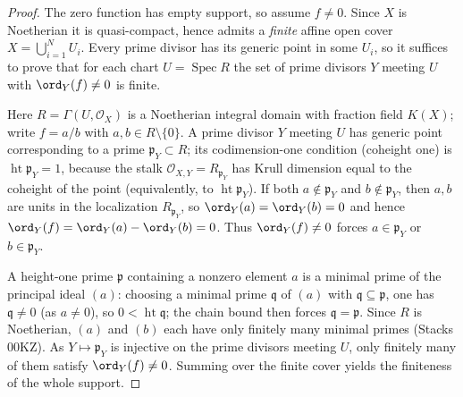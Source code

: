 \begin{proof}
  \leanok
  The zero function has empty support, so assume \(f \ne 0\). Since \(X\) is
  Noetherian it is quasi-compact, hence admits a \emph{finite} affine open cover
  \(X = \bigcup_{i=1}^{N} U_i\). Every prime divisor has its generic point in some
  \(U_i\), so it suffices to prove that for each chart \(U = \operatorname{Spec} R\)
  the set of prime divisors \(Y\) meeting \(U\) with \(\ord_Y(f) \ne 0\) is finite.

  Here \(R = \Gamma(U, \mathcal O_X)\) is a Noetherian integral domain with fraction
  field \(K(X)\); write \(f = a/b\) with \(a, b \in R \setminus \{0\}\). A prime
  divisor \(Y\) meeting \(U\) has generic point corresponding to a prime
  \(\mathfrak p_Y \subset R\); its codimension-one condition (coheight one) is
  \(\operatorname{ht}\mathfrak p_Y = 1\), because the stalk
  \(\mathcal O_{X, Y} = R_{\mathfrak p_Y}\) has Krull dimension equal to the
  coheight of the point (equivalently, to \(\operatorname{ht}\mathfrak p_Y\)). If
  both \(a \notin \mathfrak p_Y\) and \(b \notin \mathfrak p_Y\), then \(a, b\) are
  units in the localization \(R_{\mathfrak p_Y}\), so
  \(\ord_Y(a) = \ord_Y(b) = 0\) and hence
  \(\ord_Y(f) = \ord_Y(a) - \ord_Y(b) = 0\). Thus \(\ord_Y(f) \ne 0\) forces
  \(a \in \mathfrak p_Y\) or \(b \in \mathfrak p_Y\).

  A height-one prime \(\mathfrak p\) containing a nonzero element \(a\) is a minimal
  prime of the principal ideal \((a)\): choosing a minimal prime \(\mathfrak q\) of
  \((a)\) with \(\mathfrak q \subseteq \mathfrak p\), one has
  \(\mathfrak q \ne 0\) (as \(a \ne 0\)), so \(0 < \operatorname{ht}\mathfrak q\);
  the chain bound then forces \(\mathfrak q = \mathfrak p\). Since \(R\) is
  Noetherian, \((a)\) and \((b)\) each have only finitely many minimal primes
  (Stacks 00KZ). As \(Y \mapsto \mathfrak p_Y\) is injective on the prime divisors
  meeting \(U\), only finitely many of them satisfy \(\ord_Y(f) \ne 0\). Summing
  over the finite cover yields the finiteness of the whole support.
\end{proof}

